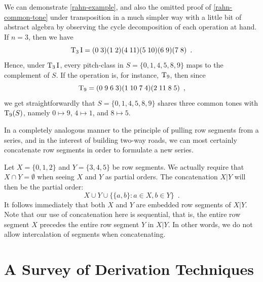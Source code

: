 \begin{example}
	We can demonstrate \ref{rahn-example}, and also the omitted proof of \ref{rahn-common-tone} under transposition in a much simpler way with a little bit of abstract algebra by observing the cycle decomposition of each operation at hand. If $n = 3$, then we have
	\begin{equation}
		\operatorname{T}_3\operatorname{I} = (0 \; 3) (1 \; 2) (4 \; 11) (5 \; 10) (6 \; 9) (7 \; 8) \enspace.
	\end{equation}
	Hence, under $\operatorname{T}_3\operatorname{I}$, every pitch-class in $S = \{ 0, 1, 4, 5, 8, 9 \}$ maps to the complement of $S$. If the operation is, for instance, $\operatorname{T}_9$, then since
	\begin{equation}
		\operatorname{T}_9 = (0 \; 9 \; 6 \; 3) (1 \; 10 \; 7 \; 4) (2 \; 11 \; 8 \; 5) \enspace,
	\end{equation}
	we get straightforwardly that $S = \{ 0, 1, 4, 5, 8, 9 \}$ shares three common tones with $\operatorname{T}_9(S)$, namely $0 \mapsto 9$, $4 \mapsto 1$, and $8 \mapsto 5$.
\end{example}

In a completely analogous manner to the principle of pulling row segments from a series, and in the interest of building two-way roads, we can most certainly concatenate row segments in order to formulate a new series. 

\begin{example}
    \cite[200]{Starr1984}
    Let $X = \{ 0, 1, 2 \}$ and $Y = \{ 3, 4, 5 \}$ be row segments. We actually require that $X \cap Y = \emptyset$ when seeing $X$ and $Y$ as partial orders. The concatenation $X | Y$ will then be the partial order:
    \begin{equation}
        X \cup Y \cup \{ \{ a, b \} : a \in X, b \in Y \} \enspace.
    \end{equation}
    It follows immediately that both $X$ and $Y$ are embedded row segments of $X | Y$. Note that our use of concatenation here is sequential, that is, the entire row segment $X$ precedes the entire row segment $Y$ in $X | Y$. In other words, we do not allow intercalation of segments when concatenating.
\end{example}

\section{A Survey of Derivation Techniques}

